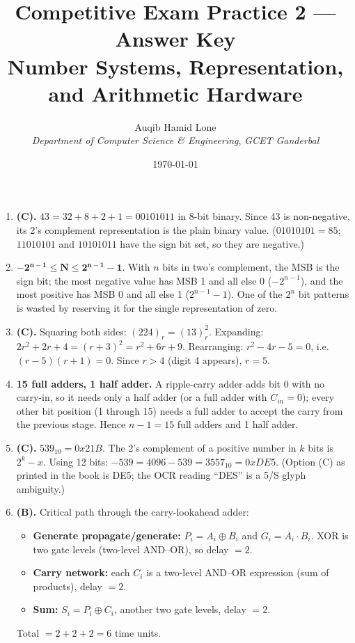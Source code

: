 \documentclass[11pt]{article}
\title{Competitive Exam Practice 2 --- Answer Key\\\large Number Systems, Representation, and Arithmetic Hardware}
\author{Auqib Hamid Lone\\[0.3em]
  \emph{Department of Computer Science \& Engineering}, \emph{GCET Ganderbal}}
\date{\today}
\begin{document}
\maketitle

\begin{enumerate}
\item[\textbf{Q1}] \textbf{(C).} $43 = 32 + 8 + 2 + 1 = 00101011$ in 8-bit binary. Since 43 is non-negative, its 2's complement representation is the plain binary value. ($01010101 = 85$; $11010101$ and $10101011$ have the sign bit set, so they are negative.)

\item[\textbf{Q2}] $\mathbf{-2^{n-1} \le N \le 2^{n-1}-1}$. With $n$ bits in two's complement, the MSB is the sign bit; the most negative value has MSB 1 and all else 0 ($-2^{n-1}$), and the most positive has MSB 0 and all else 1 ($2^{n-1}-1$). One of the $2^n$ bit patterns is wasted by reserving it for the single representation of zero.

\item[\textbf{Q3}] \textbf{(C).} Squaring both sides: $(224)_r = (13)_r^2$. Expanding: $2r^2 + 2r + 4 = (r+3)^2 = r^2 + 6r + 9$. Rearranging: $r^2 - 4r - 5 = 0$, i.e.\ $(r-5)(r+1)=0$. Since $r > 4$ (digit 4 appears), $r = 5$.

\item[\textbf{Q4}] \textbf{15 full adders, 1 half adder.} A ripple-carry adder adds bit 0 with no carry-in, so it needs only a half adder (or a full adder with $C_{in}=0$); every other bit position (1 through 15) needs a full adder to accept the carry from the previous stage. Hence $n-1 = 15$ full adders and 1 half adder.

\item[\textbf{Q5}] \textbf{(C).} $539_{10} = 0x21B$. The 2's complement of a positive number in $k$ bits is $2^k - x$. Using 12 bits: $-539 = 4096 - 539 = 3557_{10} = 0xDE5$. (Option (C) as printed in the book is DE5; the OCR reading ``DES'' is a 5/S glyph ambiguity.)

\item[\textbf{Q6}] \textbf{(B).} Critical path through the carry-lookahead adder:
\begin{itemize}
  \item \textbf{Generate propagate/generate:} $P_i = A_i \oplus B_i$ and $G_i = A_i \cdot B_i$. XOR is two gate levels (two-level AND--OR), so delay $= 2$.
  \item \textbf{Carry network:} each $C_i$ is a two-level AND--OR expression (sum of products), delay $= 2$.
  \item \textbf{Sum:} $S_i = P_i \oplus C_i$, another two gate levels, delay $= 2$.
\end{itemize}
Total $= 2 + 2 + 2 = 6$ time units.


\end{enumerate}
\end{document}
